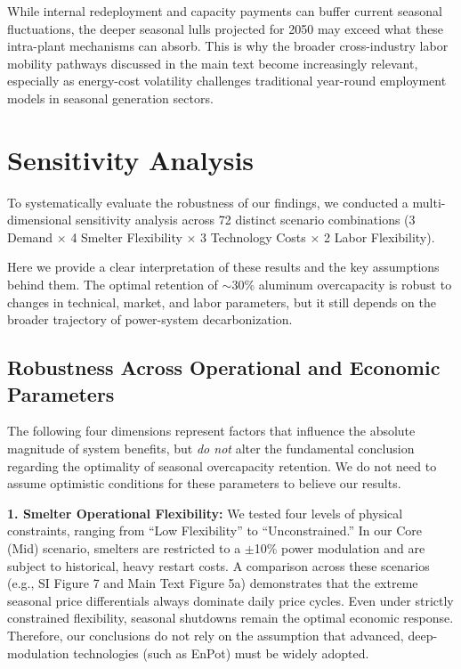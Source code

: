 \documentclass[preprint,12pt]{elsarticle}
\begin{document}
While internal redeployment and capacity payments can buffer current seasonal fluctuations, the deeper seasonal lulls projected for 2050 may exceed what these intra-plant mechanisms can absorb. This is why the broader cross-industry labor mobility pathways discussed in the main text become increasingly relevant, especially as energy-cost volatility challenges traditional year-round employment models in seasonal generation sectors.

\newpage

\section{Sensitivity Analysis}

To systematically evaluate the robustness of our findings, we conducted a multi-dimensional sensitivity analysis across 72 distinct scenario combinations (3 Demand $\times$ 4 Smelter Flexibility $\times$ 3 Technology Costs $\times$ 2 Labor Flexibility). 

Here we provide a clear interpretation of these results and the key assumptions behind them. The optimal retention of $\sim$30\% aluminum overcapacity is robust to changes in technical, market, and labor parameters, but it still depends on the broader trajectory of power-system decarbonization.

\subsection{Robustness Across Operational and Economic Parameters}
The following four dimensions represent factors that influence the absolute magnitude of system benefits, but \textit{do not} alter the fundamental conclusion regarding the optimality of seasonal overcapacity retention. We do not need to assume optimistic conditions for these parameters to believe our results.

\vspace{0.3cm}
\noindent\textbf{1. Smelter Operational Flexibility:} We tested four levels of physical constraints, ranging from ``Low Flexibility'' to ``Unconstrained.'' In our Core (Mid) scenario, smelters are restricted to a $\pm$10\% power modulation and are subject to historical, heavy restart costs. A comparison across these scenarios (e.g., SI Figure 7 and Main Text Figure 5a) demonstrates that the extreme seasonal price differentials always dominate daily price cycles. Even under strictly constrained flexibility, seasonal shutdowns remain the optimal economic response. Therefore, our conclusions do not rely on the assumption that advanced, deep-modulation technologies (such as EnPot) must be widely adopted.
\end{document}
